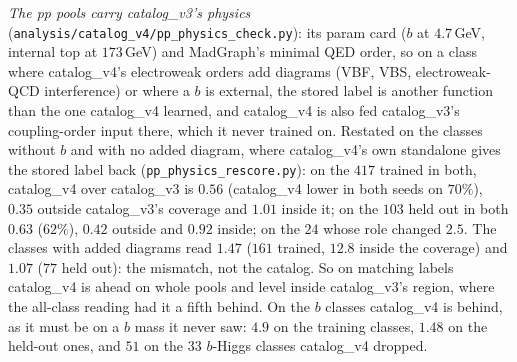 \documentclass[11pt]{article}
\newcommand{\code}[1]{\texttt{#1}}
\begin{document}
\emph{The pp pools carry catalog\_v3's physics} (\code{analysis/catalog\_v4/pp\_physics\_check.py}): its param card
($b$ at $4.7$\,GeV, internal top at $173$\,GeV) and MadGraph's minimal QED order, so on a class where catalog\_v4's
electroweak orders add diagrams (VBF, VBS, electroweak-QCD interference) or where a $b$ is external, the stored label
is another function than the one catalog\_v4 learned, and catalog\_v4 is also fed catalog\_v3's coupling-order input
there, which it never trained on. Restated on the classes without $b$ and with no added diagram, where catalog\_v4's own
standalone gives the stored label back (\code{pp\_physics\_rescore.py}): on the $417$ trained in both, catalog\_v4
over catalog\_v3 is $0.56$ (catalog\_v4 lower in both seeds on $70\%$), $0.35$ outside catalog\_v3's coverage and
$1.01$ inside it; on the $103$ held out in both $0.63$ ($62\%$), $0.42$ outside and $0.92$ inside; on the $24$ whose
role changed $2.5$. The classes with added diagrams read $1.47$ ($161$ trained, $12.8$ inside the coverage) and $1.07$
($77$ held out): the mismatch, not the catalog. So on matching labels catalog\_v4 is ahead on whole pools and level
inside catalog\_v3's region, where the all-class reading had it a fifth behind.
On the $b$ classes catalog\_v4 is behind, as it must be on a $b$ mass it never saw: $4.9$ on the training classes,
$1.48$ on the held-out ones, and $51$ on the $33$ $b$-Higgs classes catalog\_v4 dropped.
\end{document}
